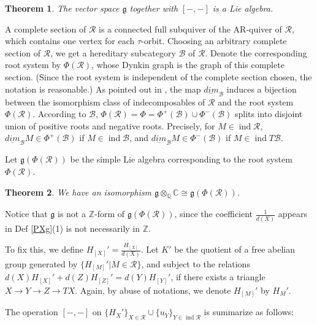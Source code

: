\documentclass[12pt]{amsart}
\newtheorem{theorem}{Theorem}[section]
\begin{document}
\begin{theorem}\cite[Thm 4.1]{1997ROOT}
The vector space $\mathfrak{g}$ together with $[-,-]$ is a Lie algebra.
\end{theorem}

A complete section of $\mathcal{R}$ is a connected full subquiver of the AR-quiver of $\mathcal{R}$, which contains one vertex for each $\tau$-orbit.
Choosing an arbitrary complete section of $\mathcal{R}$, we get a hereditary subcategory $\mathcal{B}$ of $\mathcal{R}$. 
Denote the corresponding root system by $\Phi (\mathcal{R})$, whose Dynkin graph is the graph of this complete section. (Since the root system is independent of the complete section chosen, the notation is reasonable.)
As pointed out in \cite{Happel}, the map $\underline{dim}_{\mathcal{B}}$ induces a bijection between the isomorphism class of indecomposables of $\mathcal{R}$ and the root system $\Phi(\mathcal{R})$.
According to $\mathcal{B}$, $\Phi (\mathcal{R})=\Phi=\Phi^+(\mathcal{B}) \cup \Phi^-(\mathcal{B})$ splits into disjoint union of positive roots and negative roots.
Precisely, for $M\in \operatorname{ind}\mathcal{R}$, $\underline{dim}_{\mathcal{B}} M \in \Phi^+(\mathcal{B}) $ if $M \in \operatorname{ind} \mathcal{B}$, and $\underline{dim}_{\mathcal{B}} M \in \Phi^-(\mathcal{B}) $ if $M \in \operatorname{ind} T\mathcal{B}$.   

Let $\mathfrak{g}(\Phi(\mathcal{R}))$ be the simple Lie algebra corresponding to the root system $\Phi(\mathcal{R})$.

\begin{theorem}\cite[Thm 4.2]{1997ROOT} \label{PXgiso}
 We have an isomorphism $\mathfrak{g} \otimes _{\mathbb{Q}} \mathbb{C} \cong \mathfrak{g}(\Phi(\mathcal{R}))$.
\end{theorem}

Notice that $\mathfrak{g}$ is not a $\mathbb{Z}$-form of $\mathfrak{g}(\Phi(\mathcal{R}))$, since the coefficient $\frac{1}{d(X)}$ appears in Def \ref{PXg}(1) is not necessarily in $\mathbb{Z}$.

To fix this, we define $H_{[X]}'=\frac{H_{[X]}}{d(X)}$. 
Let $K'$ be the quotient of a free abelian group generated by $\{ H_{[M]}'|M\in \mathcal{R}\}$, and subject to the relations  $d(X)H_{[X]}'+d(Z)H_{[Z]}'=d(Y)H_{[Y]}'$, if there exists a triangle $X \rightarrow Y \rightarrow Z \rightarrow TX$.
Again, by abuse of notations, we denote $H_{[M]}'$ by $H_M'$.

The operation $[-,-]$ on $\{ H_X' \}_{X\in \mathcal{R}} \cup \{ u_Y \}_{Y\in \operatorname{ind}\mathcal{R}}$ is summarize as follows:
\end{document}
